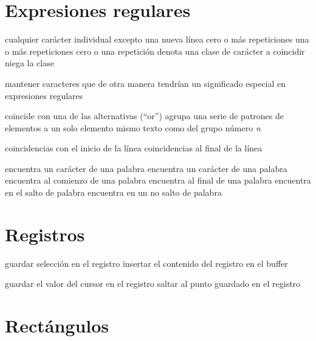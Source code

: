 \section{Expresiones regulares}

 cualquier car{\'a}cter individual excepto una nueva l{\'i}nea
\key{*} cero o m{\'a}s repeticiones
\key{+} una o m{\'a}s repeticiones
 cero o una repetici{\'o}n
\key{[$\ldots$]} denota una clase de car{\'a}cter a coincidir
\key{[\^{}$\ldots$]} niega la clase

 mantener caracteres que de otra manera tendr{\'i}an un
  significado especial en expresiones regulares

\key{$\ldots$\\|$\ldots$\\|$\ldots$} coincide con una de las
  alternativas (``or'')
\key{\\( $\ldots$ \\)} agrupa una serie de patrones de elementos a un
  solo elemento
 mismo texto como del grupo n{\'u}mero {\it n\/}

\key{\^{}} coincidencias con el inicio de la l{\'i}nea
\key{\$} coincidencias al final de la l{\'i}nea

\key{\\w} encuentra un car{\'a}cter de una palabra
\key{\\W} encuentra un car{\'a}cter de una palabra
\key{\\<} encuentra al comienzo de una palabra
\key{\\>} encuentra al final de una palabra
\key{\\b} encuentra en el salto de palabra
\key{\\B} encuentra en un no salto de palabra

\section{Registros}

 guardar selecci{\'o}n en el registro
 insertar el contenido del registro en el buffer

 guardar el valor del cursor en el registro
 saltar al punto guardado en el registro

\section{Rect{\'a}ngulos}

